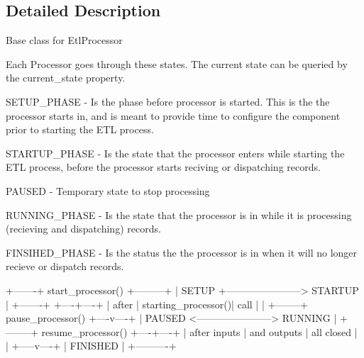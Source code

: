 \subsection{Detailed Description}
\begin{DoxyVerb}Base class for EtlProcessor

Each Processor goes through these states.  The current state can be queried
by the current_state property.

SETUP_PHASE       - Is the phase before processor is started.  This is the
                    the processor starts in, and is meant to provide time to
                    configure the component prior to starting the ETL process.

STARTUP_PHASE     - Is the state that the processor enters while starting the
                    ETL process, before the processor starts reciving or
                    dispatching records.

PAUSED            - Temporary state to stop processing

RUNNING_PHASE     - Is the state that the processor is in while it is 
                    processing (recieving and dispatching) records.

FINSIHED_PHASE    - Is the status the the processor is in when it will no
                    longer recieve or dispatch records.


                +-------+   start_processor()   +---------+
                | SETUP +-----------------------> STARTUP |
                +-------+                       +----+----+
                                                     |     
                                               after |     
                                 starting_processor()|     
                                                call |     
                                                     |     
               +--------+   pause_processor()   +----v----+
               | PAUSED <-----------------------> RUNNING |
               +--------+  resume_processor()   +----+----+
                                                     |     
                                        after inputs |     
                                         and outputs |     
                                          all closed |     
                                                     |     
                                               +-----v----+
                                               | FINISHED |
                                               +----------+    



\end{DoxyVerb}
